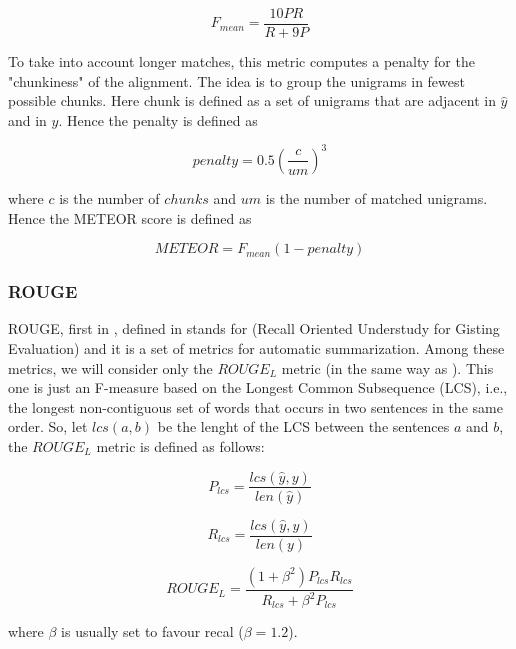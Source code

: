 \begin{equation*}
F_{mean} = \frac{10 P R}{R + 9P}
\end{equation*}

To take into account longer matches, this metric computes a penalty for the "chunkiness" of the alignment. The idea is to group the unigrams in fewest possible chunks. Here chunk is defined as a set of unigrams that are adjacent in $\hat{y}$ and in $y$. Hence the penalty is defined as

\begin{equation*}
penalty = 0.5 \left( \frac{c}{um} \right)^{3}
\end{equation*}

where $c$ is the number of $chunks$ and $um$ is the number of matched unigrams. Hence the METEOR score is defined as

\begin{equation*}
METEOR = F_{mean} (1 - penalty)
\end{equation*}

\subsubsection{ROUGE}

ROUGE, first in \cite{Lin}, defined in stands for (Recall Oriented  Understudy  for  Gisting  Evaluation) and it is a set of metrics for automatic summarization. Among these metrics, we will consider only the $ROUGE_L$ metric (in the same way as \cite{Lowe:2016}). This one is just an F-measure based on the Longest Common Subsequence (LCS), i.e., the longest non-contiguous set of words that occurs in two sentences in the same order. So, let $lcs(a,b)$ be the lenght of the LCS between the sentences $a$ and $b$, the $ROUGE_L$ metric is defined as follows: 

\begin{equation*}
P_{lcs} = \frac{lcs(\hat{y}, y)}{len(\hat{y})}
\end{equation*}    


\begin{equation*}
R_{lcs} = \frac{lcs(\hat{y}, y)}{len(y)}
\end{equation*}

\begin{equation*}
ROUGE_L = \frac{(1 + \beta^2) P_{lcs} R_{lcs}}{R_{lcs} + \beta^{2}P_{lcs}}
\end{equation*}

where $\beta$ is usually set to favour recal ($\beta = 1.2$).

